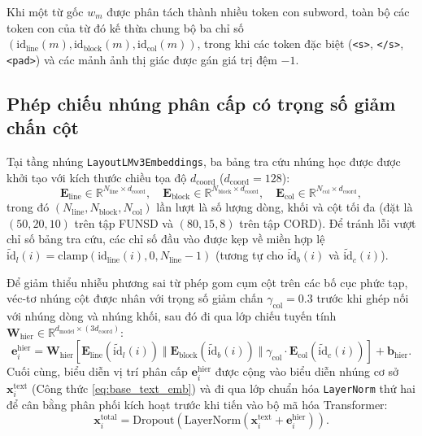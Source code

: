 Khi một từ gốc $w_m$ được phân tách thành nhiều token con subword, toàn bộ các token con của từ đó kế thừa chung bộ ba chỉ số $\left(\text{id}_{\text{line}}(m), \text{id}_{\text{block}}(m), \text{id}_{\text{col}}(m)\right)$, trong khi các token đặc biệt (\texttt{<s>}, \texttt{</s>}, \texttt{<pad>}) và các mảnh ảnh thị giác được gán giá trị đệm $-1$.

\subsection{Phép chiếu nhúng phân cấp có trọng số giảm chấn cột}
Tại tầng nhúng \texttt{LayoutLMv3Embeddings}, ba bảng tra cứu nhúng học được được khởi tạo với kích thước chiều tọa độ $d_{\text{coord}}$ ($d_{\text{coord}} = 128$):
\begin{equation}
    \mathbf{E}_{\text{line}} \in \mathbb{R}^{N_{\text{line}} \times d_{\text{coord}}}, \quad
    \mathbf{E}_{\text{block}} \in \mathbb{R}^{N_{\text{block}} \times d_{\text{coord}}}, \quad
    \mathbf{E}_{\text{col}} \in \mathbb{R}^{N_{\text{col}} \times d_{\text{coord}}},
\end{equation}
trong đó $(N_{\text{line}}, N_{\text{block}}, N_{\text{col}})$ lần lượt là số lượng dòng, khối và cột tối đa (đặt là $(50, 20, 10)$ trên tập FUNSD và $(80, 15, 8)$ trên tập CORD). Để tránh lỗi vượt chỉ số bảng tra cứu, các chỉ số đầu vào được kẹp về miền hợp lệ $\tilde{\text{id}}_l(i) = \text{clamp}(\text{id}_{\text{line}}(i), 0, N_{\text{line}}-1)$ (tương tự cho $\tilde{\text{id}}_b(i)$ và $\tilde{\text{id}}_c(i)$).

Để giảm thiểu nhiễu phương sai từ phép gom cụm cột trên các bố cục phức tạp, véc-tơ nhúng cột được nhân với trọng số giảm chấn $\gamma_{\text{col}} = 0.3$ trước khi ghép nối với nhúng dòng và nhúng khối, sau đó đi qua lớp chiếu tuyến tính $\mathbf{W}_{\text{hier}} \in \mathbb{R}^{d_{\text{model}} \times (3 d_{\text{coord}})}$:
\begin{equation}
    \label{eq:hier_proj_impl}
    \mathbf{e}_i^{\text{hier}} = \mathbf{W}_{\text{hier}} \left[ \mathbf{E}_{\text{line}}\!\left(\tilde{\text{id}}_l(i)\right) \;\Vert\; \mathbf{E}_{\text{block}}\!\left(\tilde{\text{id}}_b(i)\right) \;\Vert\; \gamma_{\text{col}} \cdot \mathbf{E}_{\text{col}}\!\left(\tilde{\text{id}}_c(i)\right) \right] + \mathbf{b}_{\text{hier}}.
\end{equation}
Cuối cùng, biểu diễn vị trí phân cấp $\mathbf{e}_i^{\text{hier}}$ được cộng vào biểu diễn nhúng cơ sở $\mathbf{x}_i^{\text{text}}$ (Công thức \ref{eq:base_text_emb}) và đi qua lớp chuẩn hóa \texttt{LayerNorm} thứ hai để cân bằng phân phối kích hoạt trước khi tiến vào bộ mã hóa Transformer:
\begin{equation}
    \label{eq:total_emb_impl}
    \mathbf{x}_i^{\text{total}} = \text{Dropout}\!\left(\text{LayerNorm}\!\left(\mathbf{x}_i^{\text{text}} + \mathbf{e}_i^{\text{hier}}\right)\right).
\end{equation}

